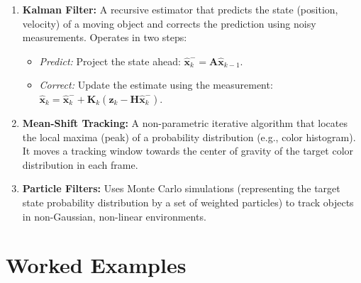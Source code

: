 \documentclass[12pt,a4paper]{article}
\begin{document}
\begin{enumerate}[leftmargin=*, itemsep=3.5pt]
  \item \textbf{Kalman Filter:} A recursive estimator that predicts the state (position, velocity) of a moving object and corrects the prediction using noisy measurements. Operates in two steps:
    \begin{itemize}[leftmargin=1em, itemsep=1.5pt]
      \item \textit{Predict:} Project the state ahead: $\hat{\mathbf{x}}_k^- = \mathbf{A}\hat{\mathbf{x}}_{k-1}$.
      \item \textit{Correct:} Update the estimate using the measurement: $\hat{\mathbf{x}}_k = \hat{\mathbf{x}}_k^- + \mathbf{K}_k(\mathbf{z}_k - \mathbf{H}\hat{\mathbf{x}}_k^-)$.
    \end{itemize}
  \item \textbf{Mean-Shift Tracking:} A non-parametric iterative algorithm that locates the local maxima (peak) of a probability distribution (e.g., color histogram). It moves a tracking window towards the center of gravity of the target color distribution in each frame.
  \item \textbf{Particle Filters:} Uses Monte Carlo simulations (representing the target state probability distribution by a set of weighted particles) to track objects in non-Gaussian, non-linear environments.
\end{enumerate}

\section{Worked Examples}
\end{document}
